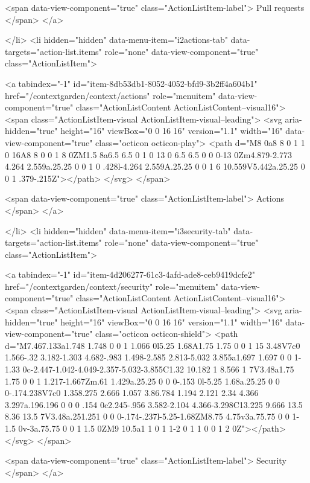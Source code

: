         <span data-view-component="true" class="ActionListItem-label">
          Pull requests
</span>      
</a>
  
</li>
        <li hidden="hidden" data-menu-item="i2actions-tab" data-targets="action-list.items" role="none" data-view-component="true" class="ActionListItem">
    
    
    <a tabindex="-1" id="item-8db53db1-8052-4052-bfd9-3b2ff4a604b1" href="/contextgarden/context/actions" role="menuitem" data-view-component="true" class="ActionListContent ActionListContent--visual16">
        <span class="ActionListItem-visual ActionListItem-visual--leading">
          <svg aria-hidden="true" height="16" viewBox="0 0 16 16" version="1.1" width="16" data-view-component="true" class="octicon octicon-play">
    <path d="M8 0a8 8 0 1 1 0 16A8 8 0 0 1 8 0ZM1.5 8a6.5 6.5 0 1 0 13 0 6.5 6.5 0 0 0-13 0Zm4.879-2.773 4.264 2.559a.25.25 0 0 1 0 .428l-4.264 2.559A.25.25 0 0 1 6 10.559V5.442a.25.25 0 0 1 .379-.215Z"></path>
</svg>
        </span>
      
        <span data-view-component="true" class="ActionListItem-label">
          Actions
</span>      
</a>
  
</li>
        <li hidden="hidden" data-menu-item="i3security-tab" data-targets="action-list.items" role="none" data-view-component="true" class="ActionListItem">
    
    
    <a tabindex="-1" id="item-4d206277-61c3-4afd-ade8-ceb9419dcfe2" href="/contextgarden/context/security" role="menuitem" data-view-component="true" class="ActionListContent ActionListContent--visual16">
        <span class="ActionListItem-visual ActionListItem-visual--leading">
          <svg aria-hidden="true" height="16" viewBox="0 0 16 16" version="1.1" width="16" data-view-component="true" class="octicon octicon-shield">
    <path d="M7.467.133a1.748 1.748 0 0 1 1.066 0l5.25 1.68A1.75 1.75 0 0 1 15 3.48V7c0 1.566-.32 3.182-1.303 4.682-.983 1.498-2.585 2.813-5.032 3.855a1.697 1.697 0 0 1-1.33 0c-2.447-1.042-4.049-2.357-5.032-3.855C1.32 10.182 1 8.566 1 7V3.48a1.75 1.75 0 0 1 1.217-1.667Zm.61 1.429a.25.25 0 0 0-.153 0l-5.25 1.68a.25.25 0 0 0-.174.238V7c0 1.358.275 2.666 1.057 3.86.784 1.194 2.121 2.34 4.366 3.297a.196.196 0 0 0 .154 0c2.245-.956 3.582-2.104 4.366-3.298C13.225 9.666 13.5 8.36 13.5 7V3.48a.251.251 0 0 0-.174-.237l-5.25-1.68ZM8.75 4.75v3a.75.75 0 0 1-1.5 0v-3a.75.75 0 0 1 1.5 0ZM9 10.5a1 1 0 1 1-2 0 1 1 0 0 1 2 0Z"></path>
</svg>
        </span>
      
        <span data-view-component="true" class="ActionListItem-label">
          Security
</span>      
</a>
  
